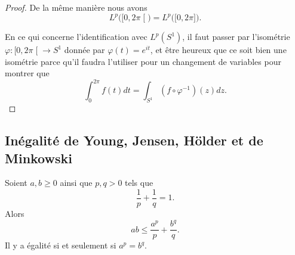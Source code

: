 \begin{proof}
	De la même manière nous avons
	\begin{equation}
		L^p\big( \mathopen[ 0 , 2\pi \mathclose[ \big)=L^p\big( \mathopen[ 0 , 2\pi \mathclose] \big).
	\end{equation}

	En ce qui concerne l'identification avec \( L^p(S^1)\), il faut passer par l'isométrie \( \varphi\colon \mathopen[ 0 , 2\pi \mathclose[\to S^1\) donnée par \( \varphi(t)= e^{it}\), et être heureux que ce soit bien une isométrie parce qu'il faudra l'utiliser pour un changement de variables pour montrer que
	\begin{equation}
		\int_0^{2\pi}f(t)dt=\int_{S^1}(f\circ\varphi^{-1})(z)dz.
	\end{equation}
\end{proof}

\subsection{Inégalité de Young, Jensen, Hölder et de Minkowski}

\begin{proposition}     \label{PROPooCQUBooCvtMSi}
	Soient \( a,b\geq 0\) ainsi que \( p,q>0\) tels que
	\begin{equation}
		\frac{1}{ p }+\frac{1}{ q }=1.
	\end{equation}
	Alors
	\begin{equation}
		ab\leq \frac{ a^p }{ p }+\frac{ b^q }{ q }.
	\end{equation}
	Il y a égalité si et seulement si \( a^p=b^q\).
\end{proposition}

